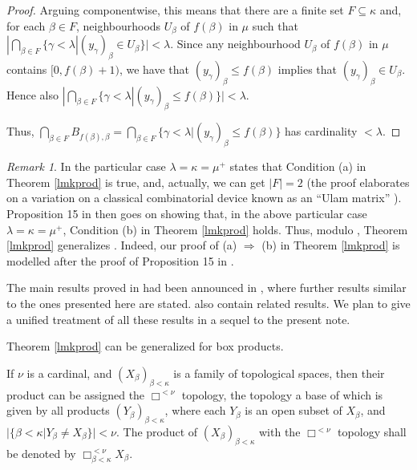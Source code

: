 \documentclass[12pt]{amsart}
\theoremstyle{definition}
\theoremstyle{remark}
\newtheorem{remark}[theorem]{Remark}
\begin{document}
\begin{proof}
Arguing componentwise, this means that
there are a finite set $ F \subseteq \kappa $
and, for each $ \beta \in F$, 
neighbourhoods $U _ \beta $ of $f( \beta )$ in $ \mu$
such that 
$|\bigcap _{\beta \in F} 
\{\gamma<\lambda| (y_\gamma )_\beta \in U_\beta\}|< \lambda $.
Since any
neighbourhood $U _ \beta $ of $f( \beta )$ in $ \mu$
contains $[0,f( \beta )+1)$, we have that 
$(y_\gamma )_\beta \leq f(\beta)$ implies
that $(y_\gamma )_\beta \in U_\beta$. Hence also
$|\bigcap _{\beta \in F} 
\{\gamma<\lambda| (y_\gamma )_\beta \leq f( \beta )\}|< \lambda $.

Thus,
 $\bigcap _{ \beta  \in F} B_{ f(\beta), \beta } =
\bigcap _{ \beta  \in F} 
\{ \gamma < \lambda | (y_\gamma )_\beta  \leq f( \beta ) \}$
 has cardinality $< \lambda $. 
   \end{proof} 

\begin{remark}\label{gen}
In the particular
case $ \lambda = \kappa = \mu^+$  \cite[Lemma 14]{topappl} states 
that Condition (a) in Theorem \ref{lmkprod} is true, and, actually,
we can get $|F|=2$ (the proof elaborates on a variation on a classical
combinatorial device known as an ``Ulam matrix'' \cite{EU}). 
Proposition 15 in \cite{topappl}  then goes on showing that,
in the above particular case $ \lambda = \kappa = \mu^+$,
Condition (b) in Theorem \ref{lmkprod} holds.
 Thus, modulo \cite[Lemma 14]{topappl}, Theorem \ref{lmkprod} generalizes
\cite[Proposition 15]{topappl}. Indeed, our proof of (a) $ \Rightarrow $ (b)
in Theorem \ref{lmkprod} is modelled after the proof of Proposition 15 in \cite{topappl}.
 
 The main results proved in \cite{topappl} had been announced in \cite{abst},
where further results similar to the ones presented here are stated.
 \cite{Cprepr,C,bumi,arxiv,topproc}
also contain related results. We plan to give a unified treatment of all 
these results in a sequel to the present note.
\end{remark}


Theorem \ref{lmkprod} can be generalized for box products.

If  $ \nu$ is a cardinal, and  
$(X_ \beta ) _{ \beta < \kappa }$ is a family of topological spaces, 
then their product can be assigned the 
$\Box^ {<\nu} $ topology, the topology a base of which
is given by all products $(Y_ \beta ) _{ \beta < \kappa }$,
where each $Y_ \beta $ is an open subset of $X_ \beta $,
and $| \{  \beta < \kappa | Y_ \beta \not= X_ \beta \}| < \nu$.   
The product of $(X_ \beta ) _{ \beta < \kappa }$
with the $\Box^ {<\nu} $ topology shall be denoted by 
$\Box^{<\nu}_{ \beta < \kappa } X_ \beta $.
\end{document}
